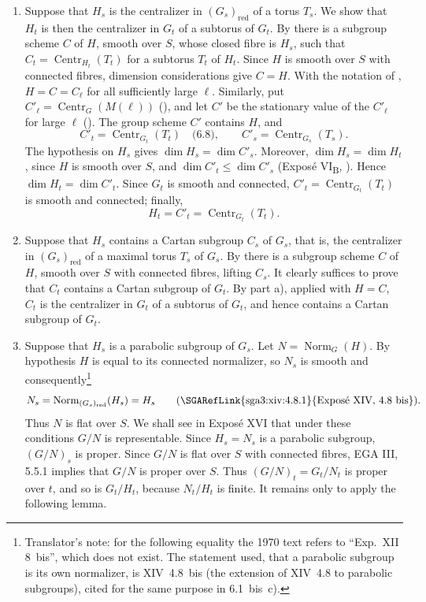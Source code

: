 \begin{enumerate}
\renewcommand{\labelenumi}{\alph{enumi})}
\item Suppose that \(H_s\) is the centralizer in \((G_s)_{\mathrm{red}}\) of a torus
\(T_s\). We show that \(H_t\) is then the centralizer in \(G_t\) of a subtorus of
\(G_t\). By  there is a subgroup scheme \(C\) of \(H\), smooth over \(S\),
whose closed fibre is \(H_s\), such that
\(C_t=\operatorname{Centr}_{H_t}(T_t)\) for a subtorus \(T_t\) of \(H_t\). Since
\(H\) is smooth over \(S\) with connected fibres, dimension considerations give
\(C=H\). With the notation of , \(H=C=C_\ell\) for all sufficiently large
\(\ell\). Similarly, put
\(C'_\ell=\operatorname{Centr}_G(M(\ell))\) (), and let \(C'\) be the stationary
value of the \(C'_\ell\) for large \(\ell\) (). The group scheme \(C'\)
contains \(H\), and
\[
C'_t=\operatorname{Centr}_{G_t}(T_t)\quad\text{(6.8)},\qquad
C'_s=\operatorname{Centr}_{G_s}(T_s).
\]
The hypothesis on \(H_s\) gives \(\dim H_s=\dim C'_s\). Moreover,
\(\dim H_s=\dim H_t\), since \(H\) is smooth over \(S\), and
\(\dim C'_t\leq \dim C'_s\) (Exposé VI\textsubscript{B}, ). Hence
\(\dim H_t=\dim C'_t\). Since \(G_t\) is smooth and connected,
\(C'_t=\operatorname{Centr}_{G_t}(T_t)\) is smooth and connected; finally,
\[
H_t=C'_t=\operatorname{Centr}_{G_t}(T_t).
\]

\item Suppose that \(H_s\) contains a Cartan subgroup \(C_s\) of \(G_s\), that is,
the centralizer in \((G_s)_{\mathrm{red}}\) of a maximal torus \(T_s\) of \(G_s\).
By  there is a subgroup scheme \(C\) of \(H\), smooth over \(S\) with connected
fibres, lifting \(C_s\). It clearly suffices to prove that \(C_t\) contains a Cartan subgroup
of \(G_t\). By part a), applied with \(H=C\), \(C_t\) is the centralizer in \(G_t\)
of a subtorus of \(G_t\), and hence contains a Cartan subgroup of \(G_t\).

\item Suppose that \(H_s\) is a parabolic subgroup of \(G_s\). Let
\(N=\operatorname{Norm}_G(H)\). By hypothesis \(H\) is equal to its connected
normalizer, so \(N_s\) is smooth and consequently\footnote{Translator's note: for the following equality the 1970 text refers to ``Exp.~XII 8~bis'', which does not exist. The statement used, that a parabolic subgroup is its own normalizer, is XIV~4.8~bis (the extension of XIV~4.8 to parabolic subgroups), cited for the same purpose in 6.1~bis~c).}
\[
N_s=\operatorname{Norm}_{(G_s)_{\mathrm{red}}}(H_s)=H_s
\qquad\text{(\SGARefLink{sga3:xiv:4.8.1}{Exposé XIV, 4.8 bis}).}
\]
Thus \(N\) is flat over \(S\). We shall see in Exposé XVI that under these
conditions \(G/N\) is representable. Since \(H_s=N_s\) is a parabolic subgroup,
\((G/N)_s\) is proper. Since \(G/N\) is flat over \(S\) with connected fibres,
EGA III, 5.5.1 implies that \(G/N\) is proper over \(S\). Thus
\((G/N)_t=G_t/N_t\) is proper over \(t\), and so is \(G_t/H_t\), because
\(N_t/H_t\) is finite. It remains only to apply the following lemma.
\end{enumerate}

